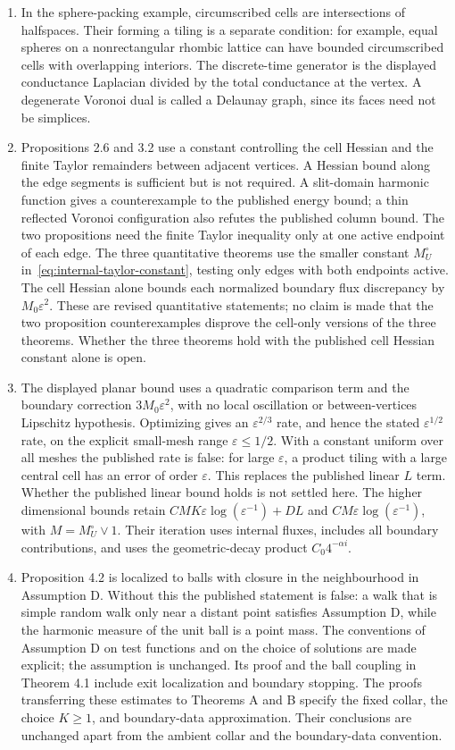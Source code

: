 \documentclass[12pt]{amsart}
\numberwithin{equation}{section}
\newcommand{\eps}{\varepsilon}
\begin{document}
\begin{enumerate}
\item In the sphere-packing example, circumscribed cells are intersections of halfspaces. Their forming a tiling is a separate condition: for example, equal spheres on a nonrectangular rhombic lattice can have bounded circumscribed cells with overlapping interiors. The discrete-time generator is the displayed conductance Laplacian divided by the total conductance at the vertex. A degenerate Voronoi dual is called a Delaunay graph, since its faces need not be simplices.
\item Propositions 2.6 and 3.2 use a constant controlling the cell Hessian and the finite Taylor remainders between adjacent vertices. A Hessian bound along the edge segments is sufficient but is not required. A slit-domain harmonic function gives a counterexample to the published energy bound; a thin reflected Voronoi configuration also refutes the published column bound. The two propositions need the finite Taylor inequality only at one active endpoint of each edge. The three quantitative theorems use the smaller constant $M_U^\circ$ in~\eqref{eq:internal-taylor-constant}, testing only edges with both endpoints active. The cell Hessian alone bounds each normalized boundary flux discrepancy by $M_0\eps^2$. These are revised quantitative statements; no claim is made that the two proposition counterexamples disprove the cell-only versions of the three theorems. Whether the three theorems hold with the published cell Hessian constant alone is open.
\item The displayed planar bound uses a quadratic comparison term and the boundary correction $3M_0\eps^2$, with no local oscillation or between-vertices Lipschitz hypothesis. Optimizing gives an $\eps^{2/3}$ rate, and hence the stated $\eps^{1/2}$ rate, on the explicit small-mesh range $\eps\le1/2$. With a constant uniform over all meshes the published rate is false: for large $\eps$, a product tiling with a large central cell has an error of order $\eps$. This replaces the published linear $L$ term. Whether the published linear bound holds is not settled here. The higher dimensional bounds retain $CMK\eps\log(\eps^{-1})+DL$ and $CM\eps\log(\eps^{-1})$, with $M=M_U^\circ\vee1$. Their iteration uses internal fluxes, includes all boundary contributions, and uses the geometric-decay product $C_0 4^{-\alpha i}$.
\item Proposition 4.2 is localized to balls with closure in the neighbourhood in Assumption D. Without this the published statement is false: a walk that is simple random walk only near a distant point satisfies Assumption D, while the harmonic measure of the unit ball is a point mass. The conventions of Assumption D on test functions and on the choice of solutions are made explicit; the assumption is unchanged. Its proof and the ball coupling in Theorem 4.1 include exit localization and boundary stopping. The proofs transferring these estimates to Theorems A and B specify the fixed collar, the choice $K\geq1$, and boundary-data approximation. Their conclusions are unchanged apart from the ambient collar and the boundary-data convention.

\end{enumerate}
\end{document}
